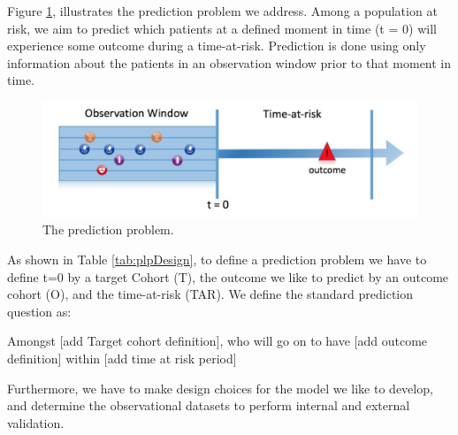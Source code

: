 \documentclass[11pt]{book}
\let\BeginKnitrBlock\begin \let\EndKnitrBlock\end
\begin{document}
Figure \ref{fig:figure1}, illustrates the prediction problem we address.
Among a population at risk, we aim to predict which patients at a
defined moment in time (t = 0) will experience some outcome during a
time-at-risk. Prediction is done using only information about the
patients in an observation window prior to that moment in time.

\begin{figure}
\includegraphics[width=1\linewidth]{images/PatientLevelPrediction/Figure1} \caption{The prediction problem.}\label{fig:figure1}
\end{figure}

As shown in Table \ref{tab:plpDesign}, to define a prediction problem we
have to define t=0 by a target Cohort (T), the outcome we like to
predict by an outcome cohort (O), and the time-at-risk (TAR). We define
the standard prediction question as:

\BeginKnitrBlock{rmdimportant}
Amongst {[}add Target cohort definition{]}, who will go on to have
{[}add outcome definition{]} within {[}add time at risk period{]}
\EndKnitrBlock{rmdimportant}

Furthermore, we have to make design choices for the model we like to
develop, and determine the observational datasets to perform internal
and external validation.
\end{document}
